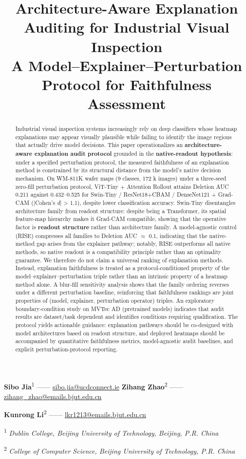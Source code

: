 \documentclass[11pt,a4paper]{article}
\title{Architecture-Aware Explanation Auditing for Industrial Visual Inspection\\
\large A Model--Explainer--Perturbation Protocol for Faithfulness Assessment}
\author{}
\date{}
\begin{document}
\maketitle
\thispagestyle{empty}


\textbf{Sibo Jia}\textsuperscript{1} ------ \href{mailto:sibo.jia@ucdconnect.ie}{sibo.jia@ucdconnect.ie} \textbf{Zihang Zhao}\textsuperscript{2} ------ \href{mailto:zihang_zhao@emails.bjut.edu.cn}{zihang\_zhao@emails.bjut.edu.cn}

\textbf{Kunrong Li}\textsuperscript{2} ------ \href{mailto:lkr1213@emails.bjut.edu.cn}{lkr1213@emails.bjut.edu.cn}

\textsuperscript{1} \emph{Dublin College, Beijing University of Technology, Beijing, P.R. China}

\textsuperscript{2} \emph{College of Computer Science, Beijing University of Technology, P.R. China}
\begin{abstract}
Industrial visual inspection systems increasingly rely on deep classifiers whose heatmap explanations may appear visually plausible while failing to identify the image regions that actually drive model decisions. This paper operationalizes an \textbf{architecture-aware explanation audit protocol} grounded in the \textbf{native-readout hypothesis}: under a specified perturbation protocol, the measured faithfulness of an explanation method is constrained by its structural distance from the model's native decision mechanism. On WM-811K wafer maps (9 classes, 172 k images) under a three-seed zero-fill perturbation protocol, ViT-Tiny + Attention Rollout attains Deletion AUC 0.211 against 0.432--0.525 for Swin-Tiny / ResNet18+CBAM / DenseNet121 + Grad-CAM (|Cohen's \emph{d}| > 1.1), despite lower classification accuracy. Swin-Tiny disentangles architecture family from readout structure: despite being a Transformer, its spatial
feature-map hierarchy makes it Grad-CAM compatible, showing that the operative factor is \textbf{readout structure} rather than architecture family. A model-agnostic control (RISE) compresses all families to Deletion AUC $\approx$ 0.1, indicating that the native-method gap arises from the explainer pathway; notably, RISE outperforms all native methods, so native readout is a compatibility principle rather than an optimality guarantee. We therefore do not claim a universal ranking of explanation methods. Instead, explanation faithfulness is treated as a protocol-conditioned property of the model--explainer--perturbation triple rather than an intrinsic property of a heatmap method alone. A blur-fill sensitivity analysis shows that the family ordering reverses under a different perturbation baseline, reinforcing that faithfulness rankings are joint properties of (model, explainer, perturbation operator) triples. An exploratory boundary-condition study on MVTec AD (pretrained
models) indicates that audit results are dataset/task dependent and identifies conditions requiring qualification. The protocol yields actionable guidance: explanation pathways should be co-designed with model architectures based on readout structure, and deployed heatmaps should be accompanied by quantitative faithfulness metrics, model-agnostic audit baselines, and explicit perturbation-protocol reporting.
\end{abstract}
\end{document}
